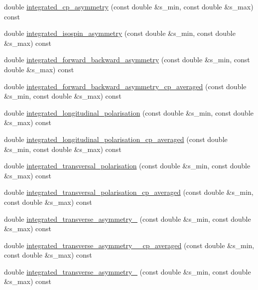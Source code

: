 \begin{DoxyCompactItemize}
double \hyperlink{classeos_1_1BToKstarDilepton_3_01LargeRecoil_01_4_a3d22ecca150af1e00e707c14fe047969}{integrated\_\-cp\_\-asymmetry} (const double \&s\_\-min, const double \&s\_\-max) const 
\item 
double \hyperlink{classeos_1_1BToKstarDilepton_3_01LargeRecoil_01_4_ad5e19e4be9af758ada5e3caf7f722df4}{integrated\_\-isospin\_\-asymmetry} (const double \&s\_\-min, const double \&s\_\-max) const 
\item 
double \hyperlink{classeos_1_1BToKstarDilepton_3_01LargeRecoil_01_4_a0161b6759525b9dafca8b4524c591c07}{integrated\_\-forward\_\-backward\_\-asymmetry} (const double \&s\_\-min, const double \&s\_\-max) const 
\item 
double \hyperlink{classeos_1_1BToKstarDilepton_3_01LargeRecoil_01_4_acaa928d3d2d91df748a418c1d333de0c}{integrated\_\-forward\_\-backward\_\-asymmetry\_\-cp\_\-averaged} (const double \&s\_\-min, const double \&s\_\-max) const 
\item 
double \hyperlink{classeos_1_1BToKstarDilepton_3_01LargeRecoil_01_4_ae4d953c9cb4a330bdaffd731c0845efe}{integrated\_\-longitudinal\_\-polarisation} (const double \&s\_\-min, const double \&s\_\-max) const 
\item 
double \hyperlink{classeos_1_1BToKstarDilepton_3_01LargeRecoil_01_4_ac451e0cec0a12b23c33d21f9961d77d4}{integrated\_\-longitudinal\_\-polarisation\_\-cp\_\-averaged} (const double \&s\_\-min, const double \&s\_\-max) const 
\item 
double \hyperlink{classeos_1_1BToKstarDilepton_3_01LargeRecoil_01_4_a748d9ddbc10e6d69e737d217e7c77193}{integrated\_\-transversal\_\-polarisation} (const double \&s\_\-min, const double \&s\_\-max) const 
\item 
double \hyperlink{classeos_1_1BToKstarDilepton_3_01LargeRecoil_01_4_a0882bddcb08b7ead987512f56e874297}{integrated\_\-transversal\_\-polarisation\_\-cp\_\-averaged} (const double \&s\_\-min, const double \&s\_\-max) const 
\item 
double \hyperlink{classeos_1_1BToKstarDilepton_3_01LargeRecoil_01_4_add9bb0e4ac8349af2d9cfdeb571cd90f}{integrated\_\-transverse\_\-asymmetry\_} (const double \&s\_\-min, const double \&s\_\-max) const 
\item 
double \hyperlink{classeos_1_1BToKstarDilepton_3_01LargeRecoil_01_4_a7e8b23d9ac0248a61c0a762e50549da2}{integrated\_\-transverse\_\-asymmetry\_\_\-cp\_\-averaged} (const double \&s\_\-min, const double \&s\_\-max) const 
\item 
double \hyperlink{classeos_1_1BToKstarDilepton_3_01LargeRecoil_01_4_a072c0868729dccd3c25d3ebfce97bb42}{integrated\_\-transverse\_\-asymmetry\_} (const double \&s\_\-min, const double \&s\_\-max) const 

\end{DoxyCompactItemize}
